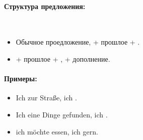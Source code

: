 \paragraph{Структура предложения:} ~\\
\begin{itemize}
\item Обычное проедложение,  + прошлое + \dverb{}.
\item {} + прошлое + \dverb{}, \dverb{} + дополнение.
\end{itemize}

\paragraph{Примеры:}
\begin{itemize}
\item Ich  zur Straße,  ich .
~\\ 
\item Ich  eine Dinge gefunden,  ich .
~\\ 
\item {} ich möchte essen,  ich gern.
~\\ 
\end{itemize}

